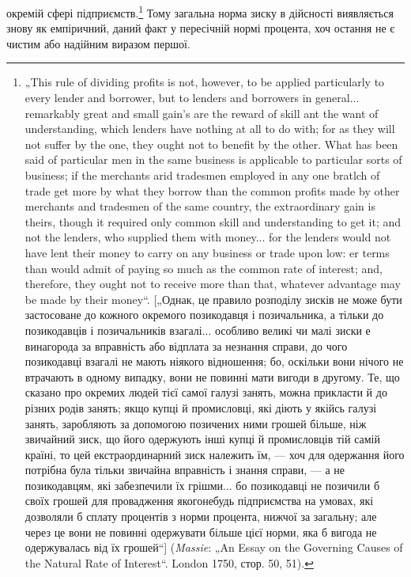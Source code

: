 \parcont{}  %
окремій сфері підприємств.\footnote{
„This rule of dividing profits is not, however, to be applied particularly to
every lender and borrower, but to lenders and borrowers in general... remarkably
great and small gain's are the reward of skill ant the want of understanding, which
lenders have nothing at all to do with; for as they will not suffer by the one,
they ought not to benefit by the other. What has been said of particular men in
the same business is applicable to particular sorts of business; if the merchants
arid tradesmen employed in any one bratlch of trade get more by what they borrow
than the common profits made by other merchants and tradesmen of the same
country, the extraordinary gain is theirs, though it required only common skill
and understanding to get it; and not the lenders, who supplied them with money...
for the lenders would not have lent their money to carry on any business or trade
upon low: er terms than would admit of paying so much as the common rate of
interest; and, therefore, they ought not to receive more than that, whatever advantage
may be made by their money“. [„Однак, це правило розподілу зисків не
може бути застосоване до кожного окремого позикодавця і позичальника, а
тільки до позикодавців і позичальників взагалі... особливо великі чи малі зиски
е винагорода за вправність або відплата за незнання справи, до чого позикодавці
взагалі не мають ніякого відношення; бо, оскільки вони нічого не втрачають
в одному випадку, вони не повинні мати вигоди в другому. Те, що сказано
про окремих людей тієї самої галузі занять, можна прикласти й до різних
родів занять; якщо купці й промисловці, які діють у якійсь галузі занять, заробляють
за допомогою позичених ними грошей більше, ніж звичайний зиск,
що його одержують інші купці й промисловців тій самій країні, то цей екстраординарний
зиск належить їм, — хоч для одержання його потрібна була тільки
звичайна вправність і знання справи, — а не позикодавцям, які забезпечили
їх грішми... бо позикодавці не позичили б своїх грошей для провадження якогонебудь
підприємства на умовах, які дозволяли б сплату процентів з норми
процента, нижчої за загальну; але через це вони не повинні одержувати більше
цієї норми, яка б вигода не одержувалась від їх грошей“] (\emph{Massie}: „An
Essay on the Governing Causes of the Natural Rate of Interest“. London 1750,
стор. 50, 51).
} Тому загальна норма зиску в дійсності
виявляється знову як емпіричний, даний факт у пересічній
нормі процента, хоч остання не є чистим або надійним виразом
першої.

